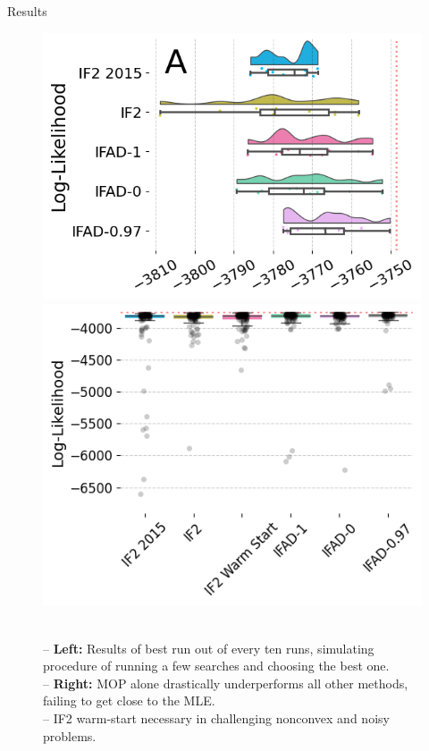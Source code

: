 \documentclass{beamer}
\begin{document}
\begin{frame}{Results}
    
\begin{figure}[H]
    \centering
    \includegraphics[scale=0.28]{imgs/095/boxplot.png}
    \includegraphics[scale=0.31]{imgs/095/boxplotall.png}
    \caption{\\
    -- \textbf{Left:} Results of best run out of every ten runs, simulating procedure of running a few searches and choosing the best one. \\
    -- \textbf{Right:} MOP alone drastically underperforms all other methods, failing to get close to the MLE. \\
    -- IF2 warm-start necessary in challenging nonconvex and noisy problems.}
    \label{fig:boxplot-search}
\end{figure}

\end{frame}
\end{document}
